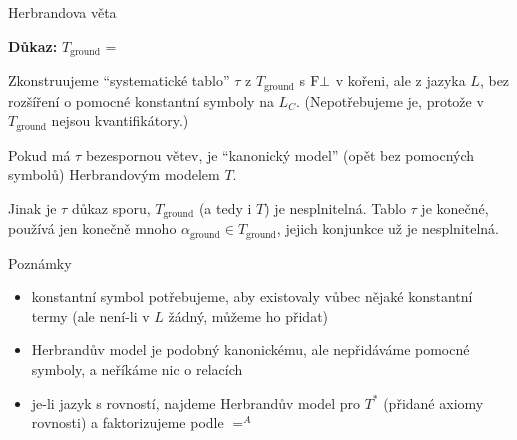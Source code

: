 \documentclass{beamer}
\begin{document}
\begin{frame}{Herbrandova věta}

    \pause 
    
    \textbf{Důkaz:}
        \alert{$T_\text{ground}$} = 

        \vspace{-3pt}
        \pause 

        Zkonstruujeme \alert{``systematické tablo''} $\tau$ z $T_\text{ground}$ s $\mathrm{F}\bot$ v kořeni, ale z jazyka $L$, bez rozšíření o pomocné konstantní symboly na $L_C$. \pause  (Nepotřebujeme je, protože v $T_\text{ground}$ nejsou kvantifikátory.)
        
        \pause 
        Pokud má $\tau$ bezespornou větev, je \alert{``kanonický model''} (opět bez pomocných symbolů) Herbrandovým modelem $T$. 
        
        \pause 
        Jinak je $\tau$ \alert{důkaz sporu}, $T_\text{ground}$ (a tedy i $T$) je nesplnitelná. Tablo $\tau$ je konečné, používá jen konečně mnoho $\alpha_\text{ground}\in T_\text{ground}$, jejich konjunkce už je nesplnitelná.\hfill\qedsymbol
    
\end{frame}


\begin{frame}{Poznámky}

    \pause
    \begin{itemize}[<+->]
        \item konstantní symbol potřebujeme, aby existovaly vůbec nějaké konstantní termy (ale není-li v $L$ žádný, můžeme ho přidat)
        \item Herbrandův model je podobný kanonickému, ale nepřidáváme pomocné symboly, a neříkáme nic o relacích
        \item je-li jazyk s rovností, najdeme Herbrandův model pro $T^*$ (přidané axiomy rovnosti) a faktorizujeme podle $=^A$
    \end{itemize}

\end{frame}
\end{document}
